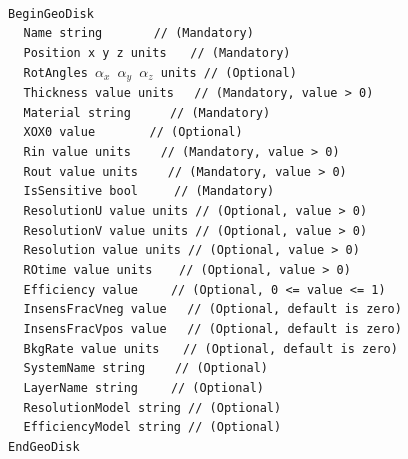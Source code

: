 ~\\
\noindent
{\tt BeginGeoDisk} \\
$~~~~~${\tt Name             string                   $~~~~~~~~~~~~$   // (Mandatory)} \\
$~~~~~${\tt Position         x  y  z units                     $~~~$   // (Mandatory)} \\
$~~~~~${\tt RotAngles        $\alpha_x$  $\alpha_y$  $\alpha_z$ units  // (Optional)}  \\
$~~~~~${\tt Thickness        value  units                       $~~$   // (Mandatory, value > 0)} \\
$~~~~~${\tt Material         string                       $~~~~~~~~$   // (Mandatory)} \\
$~~~~~${\tt XOX0             value                   $~~~~~~~~~~~~~$   // (Optional)}  \\
$~~~~~${\tt Rin              value units                     $~~~~~$   // (Mandatory, value > 0)} \\
$~~~~~${\tt Rout             value units                     $~~~~~$   // (Mandatory, value > 0)} \\
$~~~~~${\tt IsSensitive      bool                          $~~~~~~~$   // (Mandatory)} \\
$~~~~~${\tt ResolutionU      value units                               // (Optional, value > 0)} \\
$~~~~~${\tt ResolutionV      value units                               // (Optional, value > 0)} \\
$~~~~~${\tt Resolution       value units                               // (Optional, value > 0)} \\
$~~~~~${\tt ROtime           value units                      $~~~~$   // (Optional, value > 0)} \\
$~~~~~${\tt Efficiency       value                          $~~~~~~$   // (Optional, 0 <= value <= 1)} \\
$~~~~~${\tt InsensFracVneg   value                              $~~$   // (Optional, default is zero)} \\
$~~~~~${\tt InsensFracVpos   value                              $~~$   // (Optional, default is zero)} \\
$~~~~~${\tt BkgRate          value units                       $~~~$   // (Optional, default is zero)} \\
$~~~~~${\tt SystemName       string                          $~~~~~$   // (Optional)} \\
$~~~~~${\tt LayerName        string                         $~~~~~~$   // (Optional)} \\
$~~~~~${\tt ResolutionModel  string                                    // (Optional)} \\
$~~~~~${\tt EfficiencyModel  string                                    // (Optional)} \\
{\tt EndGeoDisk}

